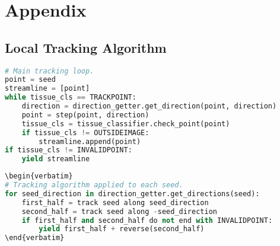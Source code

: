 \section{Appendix}

\subsection{Local Tracking Algorithm}
\label{appendix:algo}

\begin{lstlisting}[language=python]
# Main tracking loop.
point = seed
streamline = [point]
while tissue_cls == TRACKPOINT:
    direction = direction_getter.get_direction(point, direction)
    point = step(point, direction)
    tissue_cls = tissue_classifier.check_point(point)
    if tissue_cls != OUTSIDEIMAGE:
        streamline.append(point)
if tissue_cls != INVALIDPOINT:
    yield streamline
\end{lstlisting}

\begin{lstlisting}[language=python]
\begin{verbatim}
# Tracking algorithm applied to each seed.
for seed_direction in direction_getter.get_directions(seed):
    first_half = track seed along seed_direction
    second_half = track seed along -seed_direction
    if first_half and second_half do not end with INVALIDPOINT:
        yield first_half + reverse(second_half)
\end{verbatim}
\end{lstlisting}

